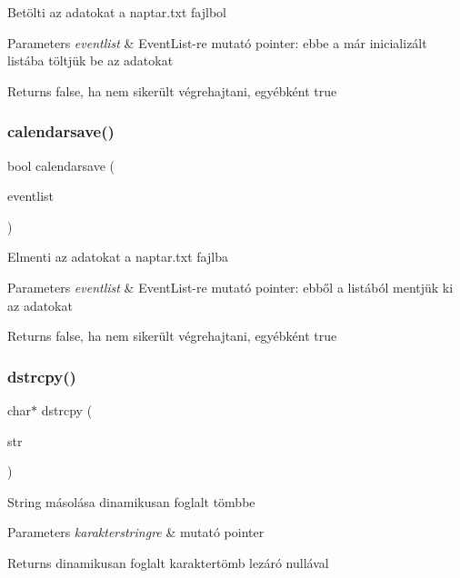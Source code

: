 Betölti az adatokat a naptar.\+txt fajlbol 
\begin{DoxyParams}{Parameters}
{\em eventlist} & Event\+List-\/re mutató pointer\+: ebbe a már inicializált listába töltjük be az adatokat \\
\hline
\end{DoxyParams}
\begin{DoxyReturn}{Returns}
false, ha nem sikerült végrehajtani, egyébként true 
\end{DoxyReturn}
\mbox{\label{group__file_ga7f69872489b7c1c4bcdd125319a87b2e}} 
\subsubsection{\texorpdfstring{calendarsave()}{calendarsave()}}
{\footnotesize\ttfamily bool calendarsave (\begin{DoxyParamCaption}\item[{\hyperlink{struct_event_list}{Event\+List} const $\ast$}]{eventlist }\end{DoxyParamCaption})}

Elmenti az adatokat a naptar.\+txt fajlba 
\begin{DoxyParams}{Parameters}
{\em eventlist} & Event\+List-\/re mutató pointer\+: ebből a listából mentjük ki az adatokat \\
\hline
\end{DoxyParams}
\begin{DoxyReturn}{Returns}
false, ha nem sikerült végrehajtani, egyébként true 
\end{DoxyReturn}
\mbox{\label{group__file_ga91b52505951ff88321e947b6e1c4b779}} 
\subsubsection{\texorpdfstring{dstrcpy()}{dstrcpy()}}
{\footnotesize\ttfamily char$\ast$ dstrcpy (\begin{DoxyParamCaption}\item[{char const $\ast$}]{str }\end{DoxyParamCaption})}

String másolása dinamikusan foglalt tömbbe 
\begin{DoxyParams}{Parameters}
{\em karakterstringre} & mutató pointer \\
\hline
\end{DoxyParams}
\begin{DoxyReturn}{Returns}
dinamikusan foglalt karaktertömb lezáró nullával 
\end{DoxyReturn}
